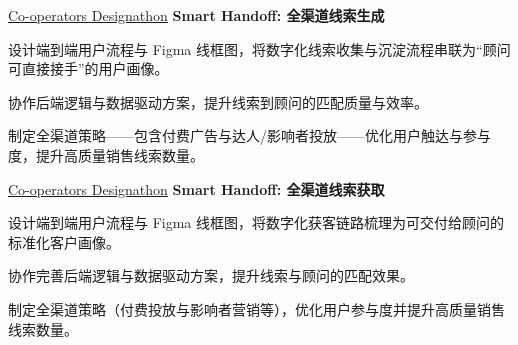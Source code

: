 \begin{twocolentry}{\hspace{.5pt} \href{https://www.cooperators.ca/}{Co-operators Designathon}}
\textbf{Smart Handoff: 全渠道线索生成}
\end{twocolentry}
\begin{onecolentry}
\begin{highlights}
\item 设计端到端用户流程与 Figma 线框图，将数字化线索收集与沉淀流程串联为“顾问可直接接手”的用户画像。
\item 协作后端逻辑与数据驱动方案，提升线索到顾问的匹配质量与效率。
\item 制定全渠道策略——包含付费广告与达人/影响者投放——优化用户触达与参与度，提升高质量销售线索数量。
\end{highlights}
\end{onecolentry}

\begin{twocolentry}{\hspace{.5pt} \href{https://www.cooperators.ca/}{Co-operators Designathon}}
\textbf{Smart Handoff: 全渠道线索获取}
\end{twocolentry}
\begin{onecolentry}
\begin{highlights}
\item 设计端到端用户流程与 Figma 线框图，将数字化获客链路梳理为可交付给顾问的标准化客户画像。
\item 协作完善后端逻辑与数据驱动方案，提升线索与顾问的匹配效果。
\item 制定全渠道策略（付费投放与影响者营销等），优化用户参与度并提升高质量销售线索数量。
\end{highlights}
\end{onecolentry}
